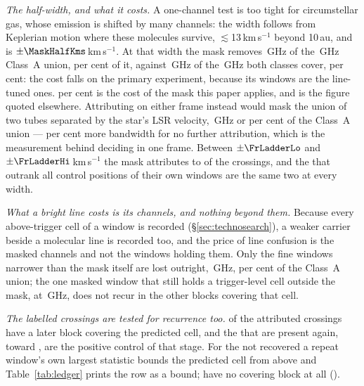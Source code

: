 \emph{The half-width, and what it costs.} A one-channel test is too tight for
circumstellar gas, whose emission is shifted by many channels: the width
follows from Keplerian motion where these molecules survive,
$\lesssim$13\,km\,s$^{-1}$ beyond 10\,au, and is
$\pm\MaskHalfKms$\,km\,s$^{-1}$. At that width the mask removes
\MkMaskAGHz\,GHz of the \CvUnionA\,GHz Class~A union, \MkMaskAPct{} per cent
of it, against \FrMaskLostGHz\,GHz of the \FrMaskUnionGHz\,GHz both classes
cover, \FrMaskPct{} per cent: the cost falls on the primary experiment,
because its windows are the line-tuned ones. \MkMaskAPct{} per cent is the
cost of the mask this paper applies, and is the figure quoted elsewhere.
Attributing on either frame instead would mask the union of two tubes
separated by the star's LSR velocity, \LsMaskTwoGHz\,GHz or
\LsMaskTwoPct{} per cent of the Class~A union --- \LsMaskAddPct{} per cent
more bandwidth for no further attribution, which is the measurement behind
deciding in one frame. Between $\pm\FrLadderLo$ and
$\pm\FrLadderHi$\,km\,s$^{-1}$ the mask attributes \FrAttrWTwenty{} to
\FrAttrWHundred{} of the crossings, and the \FrNRankPass{} that outrank all
\NCtrl{} control positions of their own windows are the same two at every
width.

\emph{What a bright line costs is its channels, and nothing beyond them.}
Because every above-trigger cell of a window is recorded
(\S\ref{sec:technosearch}), a weaker carrier beside a molecular line is
recorded too, and the price of line confusion is the masked channels and not
the windows holding them. Only the \MkNWholly{} fine windows narrower than
the mask itself are lost outright, \MkWhollyGHz\,GHz, \MkWhollyPct{} per
cent of the Class~A union; the one masked window that still holds a
trigger-level cell outside the mask, \MkSurvStar{} at \MkSurvFreq\,GHz, does
not recur in the \MkSurvNRep{} other blocks covering that cell.

\emph{The labelled crossings are tested for recurrence too.} \MkAttrTested{}
of the \MkAttr{} attributed crossings have a later block covering the
predicted cell, and the \MkAttrRecur{} that are present again, toward
\MkAttrRecurStars, are the positive control of that stage. For the
\MkAttrExcl{} not recovered a repeat window's own largest statistic bounds
the predicted cell from above and Table~\ref{tab:ledger} prints the row as a
bound; \MkAttrUntest{} have no covering block at all
(\MkAttrUntestNames).

